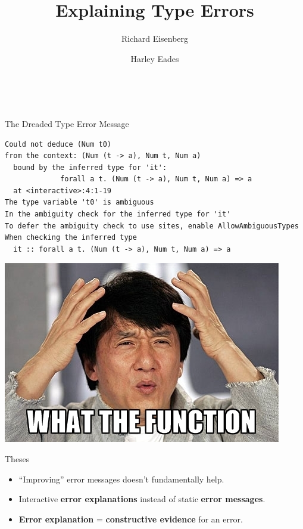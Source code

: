 \documentclass[xcolor=svgnames,12pt,aspectratio=169]{beamer}
\title{Explaining Type Errors}
\date{\theschool \\ \thedate}
\author{\usebeamercolor[fg]{title}{Brent Yorgey} \and Richard
  Eisenberg \and Harley Eades}
\newenvironment{xframe}[1][]
  {\begin{frame}[fragile,environment=xframe,#1]}
  {\end{frame}}
\renewcommand{\emph}{\textbf}
\begin{document}
\begin{xframe}{}
   \titlepage
\end{xframe}

\begin{xframe}{The Dreaded Type Error Message}
\footnotesize
\begin{Verbatim}
Could not deduce (Num t0)
from the context: (Num (t -> a), Num t, Num a)
  bound by the inferred type for 'it':
             forall a t. (Num (t -> a), Num t, Num a) => a
  at <interactive>:4:1-19
The type variable 't0' is ambiguous
In the ambiguity check for the inferred type for 'it'
To defer the ambiguity check to use sites, enable AllowAmbiguousTypes
When checking the inferred type
  it :: forall a t. (Num (t -> a), Num t, Num a) => a
\end{Verbatim}
\end{xframe}

\begin{xframe}{}
  \begin{center}
    \includegraphics{what-the-function.jpg}
  \end{center}
\end{xframe}

\begin{xframe}{Theses}
  \begin{itemize}
  \item ``Improving'' error messages doesn't fundamentally help.
  \item Interactive \emph{error explanations} instead of static
    \emph{error messages}.
  \item \emph{Error explanation} = \emph{constructive evidence} for
    an error.
  \end{itemize}
\end{xframe}
\end{document}
